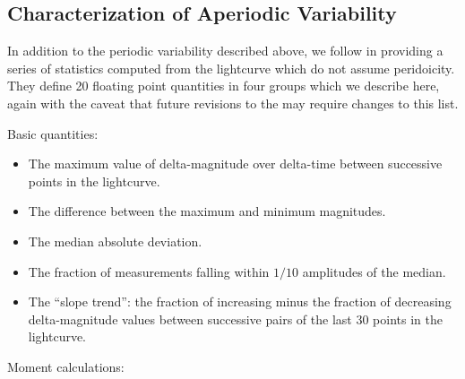 \documentclass[DM,authoryear,toc]{lsstdoc}
\begin{document}
\begin{displayquote}
\subsection{Characterization of Aperiodic Variability}

In addition to the periodic variability described above, we follow \cite{2011ApJ...733...10R} in providing a series of statistics computed from the lightcurve which do not assume peridoicity. They define 20 floating point quantities in four groups which we describe here, again with the caveat that future revisions to the \DPDD{} may require changes to this list.

Basic quantities:

\begin{itemize}
\item{The maximum value of delta-magnitude over delta-time between successive points in the lightcurve.}
\item{The difference between the maximum and minimum magnitudes.}
\item{The median absolute deviation.}
\item{The fraction of measurements falling within $1/10$ amplitudes of the median.}
\item{The ``slope trend'': the fraction of increasing minus the fraction of decreasing delta-magnitude values between successive pairs of the last 30 points in the lightcurve.}
\end{itemize}

Moment calculations:


\end{displayquote}
\end{document}
